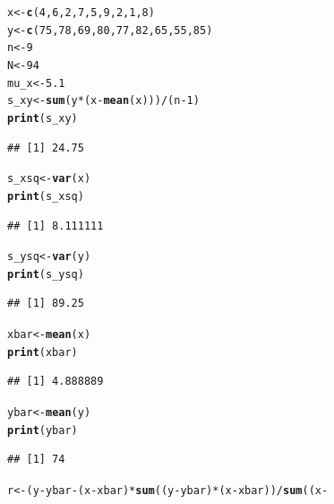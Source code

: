 \documentclass[oneside]{book}\usepackage[]{graphicx}\usepackage[dvipsnames,table,xcdraw]{xcolor}
\makeatletter
\newcommand{\hlnum}[1]{\textcolor[rgb]{0.686,0.059,0.569}{#1}}%
\newcommand{\hlopt}[1]{\textcolor[rgb]{0,0,0}{#1}}%
\newcommand{\hlstd}[1]{\textcolor[rgb]{0.345,0.345,0.345}{#1}}%
\newcommand{\hlkwb}[1]{\textcolor[rgb]{0.69,0.353,0.396}{#1}}%
\newcommand{\hlkwd}[1]{\textcolor[rgb]{0.737,0.353,0.396}{\textbf{#1}}}%
\newenvironment{kframe}{%
 \def\at@end@of@kframe{}%
 \ifinner\ifhmode%
  \def\at@end@of@kframe{\end{minipage}}%
  \begin{minipage}{\columnwidth}%
 \fi\fi%
 \def\FrameCommand##1{\hskip\@totalleftmargin \hskip-\fboxsep
 \colorbox{shadecolor}{##1}\hskip-\fboxsep
     \hskip-\linewidth \hskip-\@totalleftmargin \hskip\columnwidth}%
 \MakeFramed {\advance\hsize-\width
   \@totalleftmargin\z@ \linewidth\hsize
   \@setminipage}}%
 {\par\unskip\endMakeFramed%
 \at@end@of@kframe}
\newenvironment{knitrout}{}{} %
\makeatother
\begin{document}
\begin{knitrout}
\color{fgcolor}\begin{kframe}
\begin{alltt}
\hlstd{x} \hlkwb{<-} \hlkwd{c}\hlstd{(}\hlnum{4}\hlstd{,} \hlnum{6}\hlstd{,} \hlnum{2}\hlstd{,} \hlnum{7}\hlstd{,} \hlnum{5}\hlstd{,} \hlnum{9}\hlstd{,} \hlnum{2}\hlstd{,} \hlnum{1}\hlstd{,} \hlnum{8}\hlstd{)}
\hlstd{y} \hlkwb{<-} \hlkwd{c}\hlstd{(}\hlnum{75}\hlstd{,} \hlnum{78}\hlstd{,} \hlnum{69}\hlstd{,} \hlnum{80}\hlstd{,} \hlnum{77}\hlstd{,} \hlnum{82}\hlstd{,} \hlnum{65}\hlstd{,} \hlnum{55}\hlstd{,} \hlnum{85}\hlstd{)}
\hlstd{n} \hlkwb{<-} \hlnum{9}
\hlstd{N} \hlkwb{<-} \hlnum{94}
\hlstd{mu_x} \hlkwb{<-} \hlnum{5.1}
\hlstd{s_xy} \hlkwb{<-} \hlkwd{sum}\hlstd{(y} \hlopt{*} \hlstd{(x} \hlopt{-} \hlkwd{mean}\hlstd{(x)))}\hlopt{/}\hlstd{(n} \hlopt{-} \hlnum{1}\hlstd{)}
\hlkwd{print}\hlstd{(s_xy)}
\end{alltt}
\begin{verbatim}
## [1] 24.75
\end{verbatim}
\begin{alltt}
\hlstd{s_xsq} \hlkwb{<-} \hlkwd{var}\hlstd{(x)}
\hlkwd{print}\hlstd{(s_xsq)}
\end{alltt}
\begin{verbatim}
## [1] 8.111111
\end{verbatim}
\begin{alltt}
\hlstd{s_ysq} \hlkwb{<-} \hlkwd{var}\hlstd{(y)}
\hlkwd{print}\hlstd{(s_ysq)}
\end{alltt}
\begin{verbatim}
## [1] 89.25
\end{verbatim}
\begin{alltt}
\hlstd{xbar} \hlkwb{<-} \hlkwd{mean}\hlstd{(x)}
\hlkwd{print}\hlstd{(xbar)}
\end{alltt}
\begin{verbatim}
## [1] 4.888889
\end{verbatim}
\begin{alltt}
\hlstd{ybar} \hlkwb{<-} \hlkwd{mean}\hlstd{(y)}
\hlkwd{print}\hlstd{(ybar)}
\end{alltt}
\begin{verbatim}
## [1] 74
\end{verbatim}
\begin{alltt}
\hlstd{r} \hlkwb{<-} \hlstd{(y} \hlopt{-} \hlstd{ybar} \hlopt{-} \hlstd{(x} \hlopt{-} \hlstd{xbar)} \hlopt{*} \hlkwd{sum}\hlstd{((y} \hlopt{-} \hlstd{ybar)} \hlopt{*} \hlstd{(x} \hlopt{-} \hlstd{xbar))}\hlopt{/}\hlkwd{sum}\hlstd{((x} \hlopt{-}

\end{alltt}
\end{kframe}
\end{knitrout}
\end{document}
